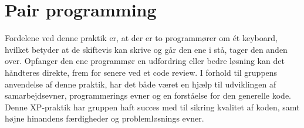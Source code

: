 \section{Pair programming}\label{sec:pairprogramming}
Fordelene ved denne praktik er, at der er to programmører om ét keyboard, 
hvilket betyder at de skiftevis kan skrive og går den ene i stå, tager den anden over. 
Opfanger den ene programmør en udfordring eller bedre løsning kan det håndteres direkte, 
frem for senere ved et code review. I forhold til gruppens anvendelse af denne praktik, har det både været en hjælp til 
udviklingen af samarbejdsevner, programmerings evner og en forståelse for den generelle kode. \\

Denne XP-praktik har gruppen haft succes med til sikring kvalitet af koden, samt højne hinandens færdigheder og problemløsnings evner.
